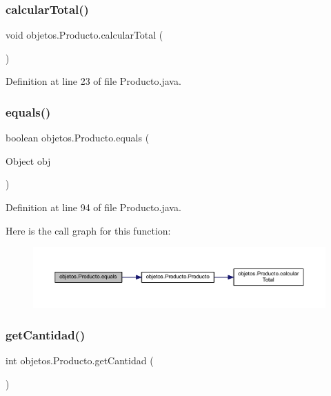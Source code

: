 \subsubsection{\texorpdfstring{calcular\+Total()}{calcularTotal()}}
{\footnotesize\ttfamily void objetos.\+Producto.\+calcular\+Total (\begin{DoxyParamCaption}{ }\end{DoxyParamCaption})}



Definition at line 23 of file Producto.\+java.

\mbox{\label{classobjetos_1_1_producto_a69f1b30e6711e637dbfd074c057adeee}} 
\subsubsection{\texorpdfstring{equals()}{equals()}}
{\footnotesize\ttfamily boolean objetos.\+Producto.\+equals (\begin{DoxyParamCaption}\item[{Object}]{obj }\end{DoxyParamCaption})}



Definition at line 94 of file Producto.\+java.

Here is the call graph for this function\+:
\nopagebreak
\begin{figure}[H]
\begin{center}
\leavevmode
\includegraphics[width=350pt]{classobjetos_1_1_producto_a69f1b30e6711e637dbfd074c057adeee_cgraph}
\end{center}
\end{figure}
\mbox{\label{classobjetos_1_1_producto_a33cadb40029d686345420c930bcabacf}} 
\subsubsection{\texorpdfstring{get\+Cantidad()}{getCantidad()}}
{\footnotesize\ttfamily int objetos.\+Producto.\+get\+Cantidad (\begin{DoxyParamCaption}{ }\end{DoxyParamCaption})}



